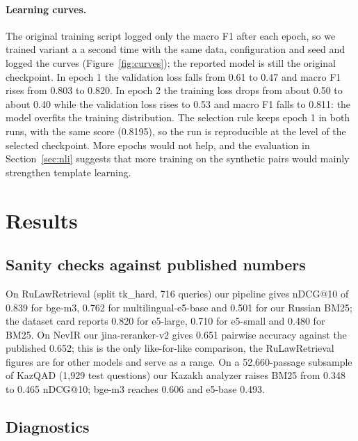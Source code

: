 \documentclass[11pt]{article}
\begin{document}
\paragraph{Learning curves.} The original training script logged only the macro F1 after each epoch, so we
trained variant a a second time with the same data, configuration and seed and logged the curves
(Figure~\ref{fig:curves}); the reported model is still the original checkpoint. In epoch 1 the validation loss
falls from 0.61 to 0.47 and macro F1 rises from 0.803 to 0.820. In epoch 2 the training loss drops from about
0.50 to about 0.40 while the validation loss rises to 0.53 and macro F1 falls to 0.811: the model overfits the
training distribution. The selection rule keeps epoch 1 in both runs, with the same score (0.8195), so the run
is reproducible at the level of the selected checkpoint. More epochs would not help, and the evaluation in
Section~\ref{sec:nli} suggests that more training on the synthetic pairs would mainly strengthen template learning.

\section{Results}

\subsection{Sanity checks against published numbers}
On RuLawRetrieval \citep{rulawretrieval2026} (split tk\_hard, 716 queries) our pipeline gives nDCG@10 of 0.839 for bge-m3, 0.762 for
multilingual-e5-base and 0.501 for our Russian BM25; the dataset card reports 0.820 for e5-large, 0.710 for
e5-small and 0.480 for BM25. On NevIR our jina-reranker-v2 gives 0.651 pairwise accuracy against the
published 0.652; this is the only like-for-like comparison, the RuLawRetrieval figures are for other models
and serve as a range. On a 52,660-passage subsample of KazQAD \citep{yeshpanov-etal-2024-kazqad} (1,929 test questions) our Kazakh analyzer raises
BM25 from 0.348 to 0.465 nDCG@10; bge-m3 reaches 0.606 and e5-base 0.493.

\subsection{Diagnostics}
\end{document}
